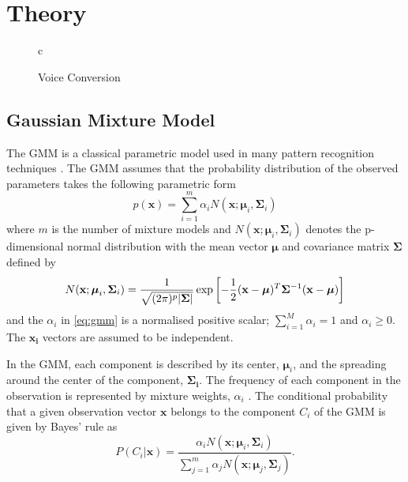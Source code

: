 \chapter{Theory} %
\label{cha:theory}

\begin{figure}[htbp]
  \centering
   \begin{tabular}[h]{c}
  \end{tabular}
  \caption{Voice Conversion}
  \label{fig:ADPCM}
\end{figure}

\section{Gaussian Mixture Model} %
\label{sec:gaussian_mixture_model}
The GMM is a classical parametric model used in many pattern recognition techniques \cite{stylianou98}. The GMM assumes that the probability distribution of the observed parameters takes the following parametric form
\begin{equation}
	\label{eq:gmm}
	p(\mathbf{x}) = \sum_{i=1}^{m} \alpha_i N(\mathbf{x}; \boldsymbol{\mu}_i, \mathbf{\Sigma}_i)
\end{equation}
where $m$ is the number of mixture models and $N(\mathbf{x}; \boldsymbol{\mu}_i, \mathbf{\Sigma}_i)$ denotes the p-dimensional normal distribution with the mean vector $\boldsymbol{\mu}$ and covariance matrix $\mathbf{\Sigma}$ defined by
\begin{equation}
	N(\mathbf{x}; \boldsymbol{\mu}_i, \mathbf{\Sigma}_i) = \frac{1}{\sqrt{(2\pi)^p\lvert\mathbf{\Sigma}\rvert}} \exp\left[ -\frac{1}{2} (\mathbf{x} -\boldsymbol{\mu})^T \mathbf{\Sigma}^{-1} (\mathbf{x} -\boldsymbol{\mu})\right]
\end{equation}
and the $\alpha_i$ in \eqref{eq:gmm} is a normalised positive scalar; $\sum_{i=1}^{M}\alpha_i = 1$ and $\alpha_i \geq 0$. The $\mathbf{x_i}$ vectors are assumed to be independent.

In the GMM, each component is described by its center, $\boldsymbol{\mu}_i$, and the spreading around the center of the component, $\mathbf{\Sigma_i}$. The frequency of each component in the observation is represented by mixture weights, $\alpha_i$ \cite{stylianou98}. The conditional probability that a given observation vector $\mathbf{x}$ belongs to the component $C_i$ of the GMM is given by Bayes' rule \cite{statistikk} as
\begin{equation}
	\label{eq:bayes}
	P(C_i\vert \mathbf{x}) = \frac{\alpha_i N(\mathbf{x}; \boldsymbol{\mu}_i, \mathbf{\Sigma}_i)}{\sum_{j=1}^{m}\alpha_j N(\mathbf{x}; \boldsymbol{\mu}_j, \mathbf{\Sigma}_j)}.
\end{equation}

